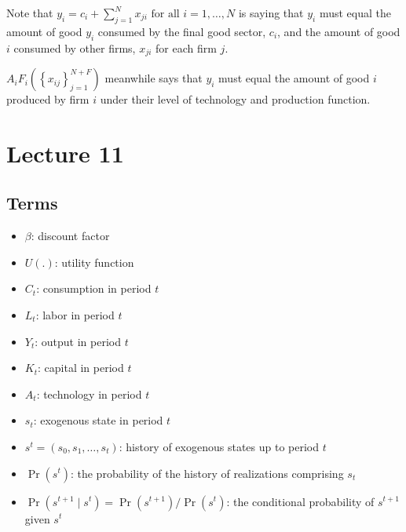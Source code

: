 \documentclass[10pt]{article}
\begin{document}
Note that $y_i=c_i+\sum_{j=1}^N x_{j i} \text { for all } i=1, \ldots, N$ 
is saying that $y_i$ must equal the amount of good $y_i$ consumed 
by the final good sector, $c_i$, and the 
amount of good $i$ consumed by other firms, $x_{j i}$ for each firm $j$.

$A_i F_i\left(\left\{x_{i j}\right\}_{j=1}^{N+F}\right)$ meanwhile 
says that $y_i$ must equal the amount of good $i$ produced by firm $i$
under their level of technology and production function.


\section{Lecture 11}

\subsection{Terms}

\begin{itemize}
    \item $\beta$: discount factor
    \item $U(.)$: utility function
    \item $C_t$: consumption in period $t$
    \item $L_t$: labor in period $t$
    \item $Y_t$: output in period $t$
    \item $K_t$: capital in period $t$
    \item $A_t$: technology in period $t$
    \item $s_t$: exogenous state in period $t$
    \item $s^t = (s_0, s_1, \ldots, s_t)$: history of exogenous states up to period $t$
    \item $\operatorname{Pr}\left(s^t\right)$: the probability of the history of realizations comprising $s_t$
    \item $\operatorname{Pr}\left(s^{t+1} \mid s^t\right)=\operatorname{Pr}\left(s^{t+1}\right) / \operatorname{Pr}\left(s^t\right)$: the conditional probability of $s^{t+1}$ given $s^t$
\end{itemize}

\end{document}
